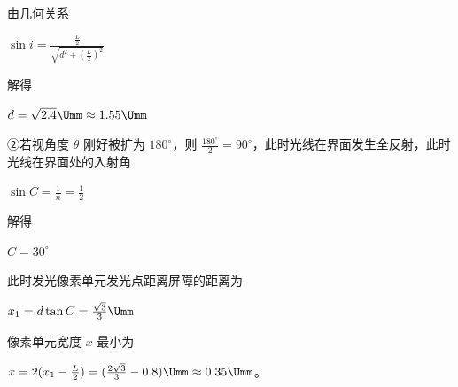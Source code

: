 \documentclass[\gkver]{gaokaozhenti}
\begin{document}
\begin{enumerate}
{由几何关系

$\sin i = \frac{\frac{L}{2}}{\sqrt{d^{2} + (\frac{L}{2})^{2}}}$

解得

$d = \sqrt{2.4}\Umm \approx 1.55\Umm$

②若视角度 $\theta$ 刚好被扩为 $180^{\circ}$，则 $\frac{180^{\circ}}{2} = 90^{\circ}$，此时光线在界面发生全反射，此时光线在界面处的入射角

$\sin C = \frac{1}{n} = \frac{1}{2}$

解得

$C = 30^{\circ}$

此时发光像素单元发光点距离屏障的距离为

$x_{1} = d\tan C = \frac{\sqrt{3}}{3}\Umm$

像素单元宽度 $x$ 最小为

$x = 2(x_{1} - \frac{L}{2}) = (\frac{2\sqrt{3}}{3} - 0.8)\Umm \approx 0.35\Umm$。
}

\end{enumerate}
\end{document}
